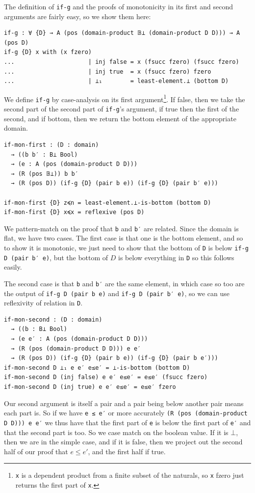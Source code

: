 \documentclass[12pt,a4paper,twoside,openright]{report}
\begin{document}
The definition of \texttt{if-g} and the proofs of monotonicity in its first and second arguments are fairly easy, so we show them here:
\begin{verbatim}
if-g : ∀ {D} → A (pos (domain-product 𝔹⊥ (domain-product D D))) → A (pos D)
if-g {D} x with (x fzero)
...                     | inj false = x (fsucc fzero) (fsucc fzero)
...                     | inj true  = x (fsucc fzero) fzero
...                     | ⊥₁        = least-element.⊥ (bottom D)
\end{verbatim}
We define \texttt{if-g} by case-analysis on its first argument\footnote{\texttt{x} is a dependent product from a finite subset of the naturals, so \texttt{x} fzero just returns the first part of \texttt{x}.}. If false, then we take the second part of the second part of \texttt{if-g}'s argument, if true then the first of the second, and if bottom, then we return the bottom element of the appropriate domain. 
\begin{verbatim}
if-mon-first : (D : domain)
  → ((b b′ : B⊥ Bool)
  → (e : A (pos (domain-product D D)))
  → (R (pos 𝔹⊥)) b b′
  → (R (pos D)) (if-g {D} (pair b e)) (if-g {D} (pair b′ e)))

if-mon-first {D} z≼n = least-element.⊥-is-bottom (bottom D)
if-mon-first {D} x≼x = reflexive (pos D)
\end{verbatim}
We pattern-match on the proof that \texttt{b} and \texttt{b′} are related. Since the domain is flat, we have two cases. The first case is that one is the bottom element, and so to show it is monotonic, we just need to show that the bottom of \texttt{D} is below \texttt{if-g {D} (pair b′ e)}, but the bottom of $D$ is below everything in \texttt{D} so this follows easily.

The second case is that \texttt{b} and \texttt{b′} are the same element, in which case so too are the output of \texttt{if-g {D} (pair b e)} and \texttt{if-g {D} (pair b′ e)}, so we can use reflexivity of relation in \texttt{D}. 
\begin{verbatim}
if-mon-second : (D : domain)
  → ((b : B⊥ Bool)
  → (e e′ : A (pos (domain-product D D)))
  → (R (pos (domain-product D D))) e e′
  → (R (pos D)) (if-g {D} (pair b e)) (if-g {D} (pair b e′)))
if-mon-second D ⊥₁ e e′ e≤e′ = ⊥-is-bottom (bottom D)
if-mon-second D (inj false) e e′ e≤e′ = e≤e′ (fsucc fzero) 
if-mon-second D (inj true) e e′ e≤e′ = e≤e′ fzero
\end{verbatim}
Our second argument is itself a pair and a pair being below another pair means each part is. So if we have \texttt{e ≤ e′} or more accurately \texttt{(R (pos (domain-product D D))) e e′} we thus have that the first part of \texttt{e} is below the first part of \texttt{e′} and that the second part is too. So we case match on the boolean value. If it is $\bot$, then we are in the simple case, and if it is false, then we project out the second half of our proof that $e \leq e′$, and the first half if true. 
\end{document}
